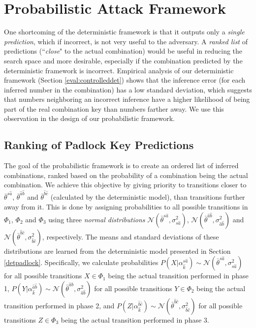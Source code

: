 \documentclass[]{IEEEtran}
\begin{document}
\section{Probabilistic Attack Framework}
\label{pattack}
One shortcoming of the deterministic framework is that it outputs only a \emph{single prediction}, which if incorrect, is not very useful to the adversary. A \emph{ranked list} of predictions (``\emph{close}" to the actual combination) would be useful in reducing the search space and more desirable, especially if the combination predicted by the deterministic framework is incorrect. Empirical analysis of our deterministic framework (Section \ref{eval:controlleddet}) shows that the inference error (for each inferred number in the combination) has a low standard deviation, which suggests that numbers neighboring an incorrect inference have a higher likelihood of being part of the real combination key than numbers farther away. We use this observation in the design of our probabilistic framework.

\subsection{Ranking of Padlock Key Predictions}
\label{probpadlock}
The goal of the probabilistic framework is to create an ordered list of inferred combinations, ranked based on the probability of a combination being the actual combination. We achieve this objective by giving priority to transitions closer to $\bar{\theta}^{s\hat{a}}$, $\bar{\theta}^{\hat{a}\hat{b}}$ and $\bar{\theta}^{\hat{b}\hat{c}}$ (calculated by the deterministic model), than transitions further away from it. This is done by assigning probabilities to all possible transitions in $\Phi_{1}$, $\Phi_{2}$ and $\Phi_{3}$ using three \emph{normal distributions} $\mathcal{N}(\bar{\theta}^{s\hat{a}},\sigma^2_{s\hat{a}})$, $\mathcal{N}(\bar{\theta}^{\hat{a}\hat{b}},\sigma^2_{\hat{a}\hat{b}})$ and $\mathcal{N}(\bar{\theta}^{\hat{b}\hat{c}},\sigma^2_{\hat{b}\hat{c}})$, respectively. The means and standard deviations of these distributions are learned from the deterministic model presented in Section \ref{detpadlock}. Specifically, we calculate probabilities $P(X|\alpha^{s\hat{a}}_{\hat{k}}) \sim \mathcal{N}(\bar{\theta}^{s\hat{a}},\sigma^2_{s\hat{a}})$ for all possible transitions $X\in \Phi_1$ being the actual transition performed in phase 1,  $P(Y|\alpha^{\hat{a}\hat{b}}_{\hat{k}}) \sim \mathcal{N}(\bar{\theta}^{\hat{a}\hat{b}},\sigma^2_{\hat{a}\hat{b}})$ for all possible transitions $Y\in \Phi_2$ being the actual transition performed in phase 2, and $P(Z|\alpha^{\hat{b}\hat{c}}_{\hat{k}}) \sim \mathcal{N}(\bar{\theta}^{\hat{b}\hat{c}},\sigma^2_{\hat{b}\hat{c}})$ for all possible transitions $Z\in \Phi_3$ being the actual transition performed in phase 3.
\end{document}
